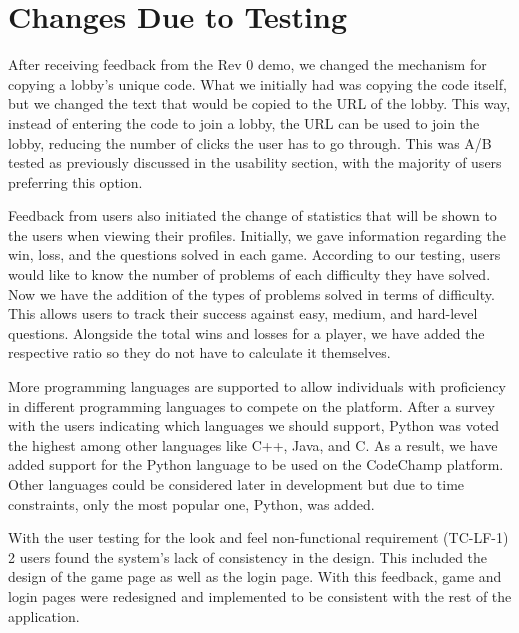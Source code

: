 \documentclass[12pt, titlepage]{article}
\begin{document}
\section{Changes Due to Testing}\label{sec:changes}


After receiving feedback from the Rev 0 demo, we changed the mechanism for copying a lobby's unique code. What we initially had was copying the code itself, but we changed the text that would be copied to the URL of the lobby. This way, instead of entering the code to join a lobby, the URL can be used to join the lobby, reducing the number of clicks the user has to go through. This was A/B tested as previously discussed in the usability section, with the majority of users preferring this option.

Feedback from users also initiated the change of statistics that will be shown to the users when viewing their profiles. Initially, we gave information regarding the win, loss, and the questions solved in each game. According to our testing, users would like to know the number of problems of each difficulty they have solved. Now we have the addition of the types of problems solved in terms of difficulty. This allows users to track their success against easy, medium, and hard-level questions. Alongside the total wins and losses for a player, we have added the respective ratio so they do not have to calculate it themselves.

More programming languages are supported to allow individuals with proficiency in different programming languages to compete on the platform. After a survey with the users indicating which languages we should support, Python was voted the highest among other languages like C++, Java, and C. As a result, we have added support for the Python language to be used on the CodeChamp platform. Other languages could be considered later in development but due to time constraints, only the most popular one, Python, was added.

With the user testing for the look and feel non-functional requirement (TC-LF-1) 2 users found the system's lack of consistency in the design. This included the design of the game page as well as the login page. With this feedback, game and login pages were redesigned and implemented to be consistent with the rest of the application.
\end{document}
